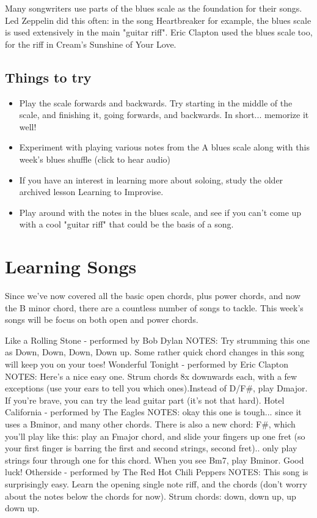 Many songwriters use parts of the blues scale as the foundation for their songs. Led Zeppelin did this often: in the song Heartbreaker for example, the blues scale is used extensively in the main "guitar riff". Eric Clapton used the blues scale too, for the riff in Cream's Sunshine of Your Love. 

\subsection{Things to try}
\begin{itemize}
\item Play the scale forwards and backwards. Try starting in the middle of the scale, and finishing it, going forwards, and backwards. In short... memorize it well!
\item Experiment with playing various notes from the A blues scale along with this week's blues shuffle (click to hear audio)
\item If you have an interest in learning more about soloing, study the older archived lesson Learning to Improvise.
\item Play around with the notes in the blues scale, and see if you can't come up with a cool "guitar riff" that could be the basis of a song. 
\end{itemize}

\section{Learning Songs}
Since we've now covered all the basic open chords, plus power chords, and now the B minor chord, there are a countless number of songs to tackle. This week's songs will be focus on both open and power chords. 

Like a Rolling Stone - performed by Bob Dylan
NOTES: Try strumming this one as Down, Down, Down, Down up. Some rather quick chord changes in this song will keep you on your toes!
Wonderful Tonight - performed by Eric Clapton
NOTES: Here's a nice easy one. Strum chords 8x downwards each, with a few exceptions (use your ears to tell you which ones).Instead of D/F\#, play Dmajor. If you're brave, you can try the lead guitar part (it's not that hard).
Hotel California - performed by The Eagles
NOTES: okay this one is tough... since it uses a Bminor, and many other chords. There is also a new chord: F\#, which you'll play like this: play an Fmajor chord, and slide your fingers up one fret (so your first finger is barring the first and second strings, second fret).. only play strings four through one for this chord. When you see Bm7, play Bminor. Good luck!
Otherside - performed by The Red Hot Chili Peppers
NOTES: This song is surprisingly easy. Learn the opening single note riff, and the chords (don't worry about the notes below the chords for now). Strum chords: down, down up, up down up. 

